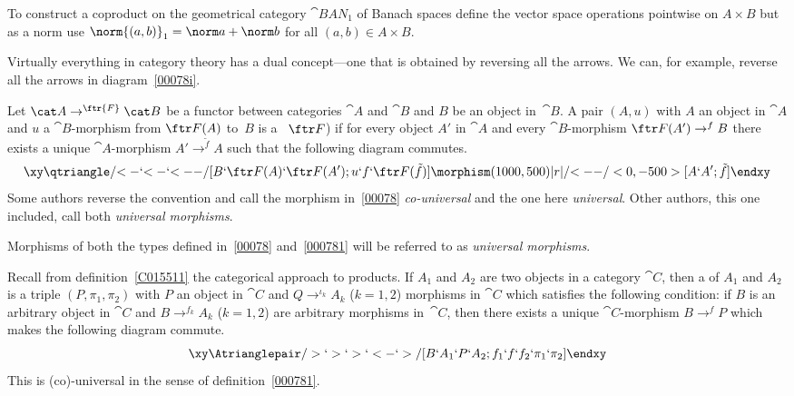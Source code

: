 \begin{exam}\label{00078037} To construct a coproduct on the geometrical category
$\cat{BAN_1}$ of Banach spaces define the vector space operations pointwise on $A \times
B$ but as a norm use $\norm{(a,b)}_1 = \norm a + \norm b$ for all $(a,b) \in A \times B$.
\end{exam}

Virtually everything in category theory has a dual concept---one that is obtained by
reversing all the arrows. We can, for example, reverse all the arrows in
diagram~\eqref{00078i}.


\begin{defn}\label{000781} Let $\cat A \to^{\ftr{F}} \cat B$ be a functor between categories
$\cat A$ and $\cat B$ and $B$ be an object in~$\cat B$.  A pair $(A,u)$ with $A$ an
object in $\cat A$ and $u$ a $\cat B$-morphism from $\ftr F(A)$ to~$B$  is a
~$\ftr F$) if for every object $A'$ in
$\cat A$ and every $\cat B$-morphism $\ftr F(A') \to^f B$ there exists a unique $\cat
A$-morphism $A' \to^{\tilde f} A$ such that the following diagram commutes.
 \begin{equation}\label{000781i}
   \xy
     \qtriangle/{<-}`{<-}`{<--}/[B`\ftr F(A)`\ftr F(A');u`f`\ftr F(\tilde f)]
     \morphism(1000,500)|r|/{<--}/<0,-500>[A`A';\tilde f]
   \endxy
 \end{equation}
Some authors reverse the convention and call the morphism in~\ref{00078}
\emph{co-universal} and the one here \emph{universal}.  Other authors, this one included,
call both \emph{universal morphisms}.
\end{defn}

\begin{conv} Morphisms of both the types defined in~\ref{00078} and~\ref{000781} will
be referred to as \emph{universal morphisms}.
\end{conv}

\begin{exam}\label{0007812} Recall from definition~\ref{C015511} the categorical approach to products.  If
$A_1$ and $A_2$ are two objects in a category $\cat C$, then a
 of $A_1$ and $A_2$ is a triple $(P,\pi_1,\pi_2)$ with $P$ an object in $\cat
C$ and $Q \to^{\iota_k} A_k$ ($k = 1,2$) morphisms in $\cat C$ which satisfies the
following condition: if $B$ is an arbitrary object in $\cat C$ and $B \to^{f_k} A_k$ ($k
= 1,2$) are arbitrary morphisms in~$\cat C$, then there exists a unique $\cat C$-morphism
$B \to^f P$ which makes the following diagram commute.
  \begin{equation}
    \xy
      \Atrianglepair/>`>`>`<-`>/[B`A_1`P`A_2;f_1`f`f_2`\pi_1`\pi_2]
    \endxy
   \end{equation}
This is (co)-universal in the sense of definition~\ref{000781}.
\end{exam}

